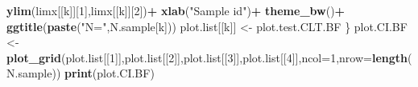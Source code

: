 \documentclass[]{book}
\newenvironment{Shaded}{\begin{snugshade}}{\end{snugshade}}
\newcommand{\KeywordTok}[1]{\textcolor[rgb]{0.13,0.29,0.53}{\textbf{#1}}}
\newcommand{\DataTypeTok}[1]{\textcolor[rgb]{0.13,0.29,0.53}{#1}}
\newcommand{\DecValTok}[1]{\textcolor[rgb]{0.00,0.00,0.81}{#1}}
\newcommand{\StringTok}[1]{\textcolor[rgb]{0.31,0.60,0.02}{#1}}
\newcommand{\OperatorTok}[1]{\textcolor[rgb]{0.81,0.36,0.00}{\textbf{#1}}}
\newcommand{\NormalTok}[1]{#1}
\theoremstyle{definition}
\theoremstyle{definition}
\theoremstyle{definition}
\theoremstyle{remark}
\begin{document}
\begin{Shaded}
\begin{Highlighting}[]
\StringTok{      }\KeywordTok{ylim}\NormalTok{(limx[[k]][}\DecValTok{1}\NormalTok{],limx[[k]][}\DecValTok{2}\NormalTok{])}\OperatorTok{+}
\StringTok{      }\KeywordTok{xlab}\NormalTok{(}\StringTok{"Sample id"}\NormalTok{)}\OperatorTok{+}
\StringTok{      }\KeywordTok{theme_bw}\NormalTok{()}\OperatorTok{+}
\StringTok{      }\KeywordTok{ggtitle}\NormalTok{(}\KeywordTok{paste}\NormalTok{(}\StringTok{"N="}\NormalTok{,N.sample[k]))}
\NormalTok{  plot.list[[k]] <-}\StringTok{ }\NormalTok{plot.test.CLT.BF}
\NormalTok{\}}
\NormalTok{plot.CI.BF <-}\StringTok{ }\KeywordTok{plot_grid}\NormalTok{(plot.list[[}\DecValTok{1}\NormalTok{]],plot.list[[}\DecValTok{2}\NormalTok{]],plot.list[[}\DecValTok{3}\NormalTok{]],plot.list[[}\DecValTok{4}\NormalTok{]],}\DataTypeTok{ncol=}\DecValTok{1}\NormalTok{,}\DataTypeTok{nrow=}\KeywordTok{length}\NormalTok{(N.sample))}
\KeywordTok{print}\NormalTok{(plot.CI.BF)}


\end{Highlighting}
\end{Shaded}
\end{document}
